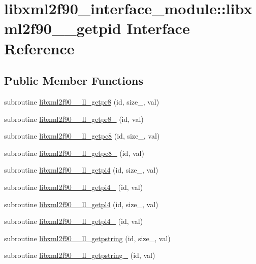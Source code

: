 \hypertarget{interfacelibxml2f90__interface__module_1_1libxml2f90____getpid}{}\section{libxml2f90\+\_\+interface\+\_\+module\+:\+:libxml2f90\+\_\+\+\_\+getpid Interface Reference}
\label{interfacelibxml2f90__interface__module_1_1libxml2f90____getpid}
\subsection*{Public Member Functions}
\begin{DoxyCompactItemize}
\item 
subroutine \hyperlink{interfacelibxml2f90__interface__module_1_1libxml2f90____getpid_af474b6255026bbfa4b963fc19747c9aa}{libxml2f90\+\_\+\+\_\+ll\+\_\+getpr8} (id, size\+\_\+, val)
\item 
subroutine \hyperlink{interfacelibxml2f90__interface__module_1_1libxml2f90____getpid_a3dbeb5a3b2d86deea3579d7f6d93477e}{libxml2f90\+\_\+\+\_\+ll\+\_\+getpr8\+\_\+} (id, val)
\item 
subroutine \hyperlink{interfacelibxml2f90__interface__module_1_1libxml2f90____getpid_a3a871a325c073963ca30129eaede902c}{libxml2f90\+\_\+\+\_\+ll\+\_\+getpc8} (id, size\+\_\+, val)
\item 
subroutine \hyperlink{interfacelibxml2f90__interface__module_1_1libxml2f90____getpid_a3d468e8c1914f323a909681e19c25d58}{libxml2f90\+\_\+\+\_\+ll\+\_\+getpc8\+\_\+} (id, val)
\item 
subroutine \hyperlink{interfacelibxml2f90__interface__module_1_1libxml2f90____getpid_a85aca6d7ce7d8055d238d1f0b1174458}{libxml2f90\+\_\+\+\_\+ll\+\_\+getpi4} (id, size\+\_\+, val)
\item 
subroutine \hyperlink{interfacelibxml2f90__interface__module_1_1libxml2f90____getpid_a349175643652c5565972552050185a27}{libxml2f90\+\_\+\+\_\+ll\+\_\+getpi4\+\_\+} (id, val)
\item 
subroutine \hyperlink{interfacelibxml2f90__interface__module_1_1libxml2f90____getpid_a748e0f1d1f15acf61515e4babc1fcb36}{libxml2f90\+\_\+\+\_\+ll\+\_\+getpl4} (id, size\+\_\+, val)
\item 
subroutine \hyperlink{interfacelibxml2f90__interface__module_1_1libxml2f90____getpid_a149bf2528e9e1834306990ff22d6f1e9}{libxml2f90\+\_\+\+\_\+ll\+\_\+getpl4\+\_\+} (id, val)
\item 
subroutine \hyperlink{interfacelibxml2f90__interface__module_1_1libxml2f90____getpid_ab2a74ea42737dfc0388e8b2e3211a251}{libxml2f90\+\_\+\+\_\+ll\+\_\+getpstring} (id, size\+\_\+, val)
\item 
subroutine \hyperlink{interfacelibxml2f90__interface__module_1_1libxml2f90____getpid_ab7c0ca8e53607453ec3e7c244ca9588d}{libxml2f90\+\_\+\+\_\+ll\+\_\+getpstring\+\_\+} (id, val)
\end{DoxyCompactItemize}



